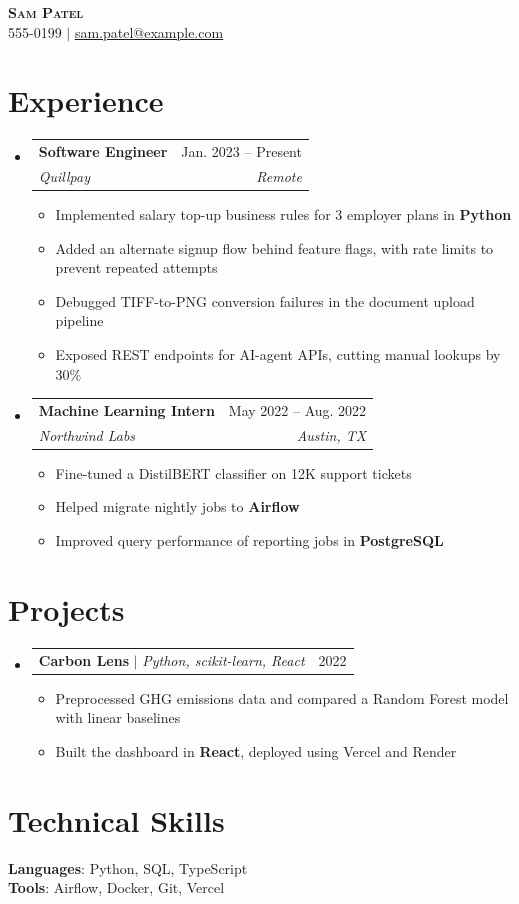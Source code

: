 \documentclass[letterpaper,11pt]{article}
\makeatletter
\newcommand{\resumeItem}[1]{
  \item\small{
    {#1 \vspace{-2pt}}
  }
}
\newcommand{\resumeSubheading}[4]{
  \vspace{-2pt}\item
    \begin{tabular*}{0.97\textwidth}[t]{l@{\extracolsep{\fill}}r}
      \textbf{#1} & #2 \\
      \textit{\small#3} & \textit{\small #4} \\
    \end{tabular*}\vspace{-7pt}
}
\newcommand{\resumeProjectHeading}[2]{
    \item
    \begin{tabular*}{0.97\textwidth}{l@{\extracolsep{\fill}}r}
      \small#1 & #2 \\
    \end{tabular*}\vspace{-7pt}
}
\newcommand{\resumeSubHeadingListStart}{\begin{itemize}[leftmargin=0.15in, label={}]}
\newcommand{\resumeSubHeadingListEnd}{\end{itemize}}
\newcommand{\resumeItemListStart}{\begin{itemize}}
\newcommand{\resumeItemListEnd}{\end{itemize}\vspace{-5pt}}
\makeatother
\begin{document}
\begin{center}
    \textbf{\Huge \scshape Sam Patel} \\ \vspace{1pt}
    \small 555-0199 $|$ \href{mailto:sam.patel@example.com}{\underline{sam.patel@example.com}}
\end{center}

\section{Experience}
  \resumeSubHeadingListStart

    \resumeSubheading
      {Software Engineer}{Jan. 2023 -- Present}
      {Quillpay}{Remote}
      \resumeItemListStart
        \resumeItem{Implemented salary top-up business rules for 3 employer plans in \textbf{Python}}
        \resumeItem{Added an alternate signup flow behind feature flags, with rate limits to prevent repeated attempts}
        \resumeItem{Debugged TIFF-to-PNG conversion failures in the document upload pipeline}
        \resumeItem{Exposed REST endpoints for AI-agent APIs, cutting manual lookups by 30\%}
      \resumeItemListEnd

    \resumeSubheading
      {Machine Learning Intern}{May 2022 -- Aug. 2022}
      {Northwind Labs}{Austin, TX}
      \resumeItemListStart
        \resumeItem{Fine-tuned a DistilBERT classifier on 12K support tickets}
        \resumeItem{Helped migrate nightly jobs to \textbf{Airflow}}
        \resumeItem{Improved query performance of reporting jobs in \textbf{PostgreSQL}}
      \resumeItemListEnd

  \resumeSubHeadingListEnd

\section{Projects}
    \resumeSubHeadingListStart
      \resumeProjectHeading
          {\textbf{Carbon Lens} $|$ \emph{Python, scikit-learn, React}}{2022}
          \resumeItemListStart
            \resumeItem{Preprocessed GHG emissions data and compared a Random Forest model with linear baselines}
            \resumeItem{Built the dashboard in \textbf{React}, deployed using Vercel and Render}
          \resumeItemListEnd
    \resumeSubHeadingListEnd

\section{Technical Skills}
 \begin{itemize}[leftmargin=0.15in, label={}]
    \small{\item{
     \textbf{Languages}{: Python, SQL, TypeScript} \\
     \textbf{Tools}{: Airflow, Docker, Git, Vercel}
    }}
 \end{itemize}
\end{document}
